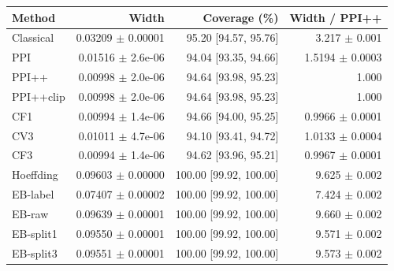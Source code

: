 \small
\begin{tabular}{lrrr}
\toprule
Method & Width & Coverage (\%) & Width / PPI++ \\
\midrule
Classical & 0.03209 $\pm$ 0.00001 & 95.20 [94.57, 95.76] & 3.217 $\pm$ 0.001 \\
PPI & 0.01516 $\pm$ 2.6e-06 & 94.04 [93.35, 94.66] & 1.5194 $\pm$ 0.0003 \\
PPI++ & 0.00998 $\pm$ 2.0e-06 & 94.64 [93.98, 95.23] & 1.000 \\
PPI++clip & 0.00998 $\pm$ 2.0e-06 & 94.64 [93.98, 95.23] & 1.000 \\
CF1 & 0.00994 $\pm$ 1.4e-06 & 94.66 [94.00, 95.25] & 0.9966 $\pm$ 0.0001 \\
CV3 & 0.01011 $\pm$ 4.7e-06 & 94.10 [93.41, 94.72] & 1.0133 $\pm$ 0.0004 \\
CF3 & 0.00994 $\pm$ 1.4e-06 & 94.62 [93.96, 95.21] & 0.9967 $\pm$ 0.0001 \\
Hoeffding & 0.09603 $\pm$ 0.00000 & 100.00 [99.92, 100.00] & 9.625 $\pm$ 0.002 \\
EB-label & 0.07407 $\pm$ 0.00002 & 100.00 [99.92, 100.00] & 7.424 $\pm$ 0.002 \\
EB-raw & 0.09639 $\pm$ 0.00001 & 100.00 [99.92, 100.00] & 9.660 $\pm$ 0.002 \\
EB-split1 & 0.09550 $\pm$ 0.00001 & 100.00 [99.92, 100.00] & 9.571 $\pm$ 0.002 \\
EB-split3 & 0.09551 $\pm$ 0.00001 & 100.00 [99.92, 100.00] & 9.573 $\pm$ 0.002 \\
\bottomrule
\end{tabular}
